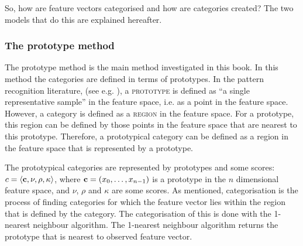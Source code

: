 So, how are feature vectors categorised and how are categories created? The two models that do this are explained hereafter.

\subsubsection{The prototype method}\label{s:cm:prototype}

The prototype method is the main method investigated in this book. In this method the categories are defined in terms of prototypes. In the pattern recognition literature, (see e.g. \citealt{banks:1990}), a {\scshape prototype} is defined as ``a single representative sample'' in the feature space, i.e. as a point in the feature space. However, a category is defined as a {\scshape region} in the feature space. For a prototype, this region can be defined by those points in the feature space that are nearest to this prototype. Therefore, a prototypical category can be defined as a region in the feature space that is represented by a prototype.

The prototypical categories are represented by prototypes and some scores: $c=\langle {\bf c},\nu,\rho,\kappa \rangle$, where ${\bf c}=(x_0,\ldots,x_{n-1})$ is a prototype in the $n$ dimensional feature space, and $\nu$, $\rho$ and $\kappa$ are some scores. As mentioned, categorisation is the process of finding categories for which the feature vector lies within the region that is defined by the category. The categorisation of this is done with the 1-nearest neighbour algorithm. The 1-nearest neighbour algorithm returns the prototype that is nearest to observed feature vector. 

